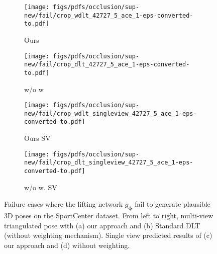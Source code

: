 \documentclass[runningheads]{llncs}
\def\Mat#1{{\boldsymbol{#1}}}
\begin{document}
\begin{figure*}
	\begin{subfigure}[b]{0.24\linewidth}        \centering
		\texttt{[image: figs/pdfs/occlusion/sup-new/fail/crop\_wdlt\_42727\_5\_ace\_1-eps-converted-to.pdf]}
		\caption{Ours}
\end{subfigure}
	\begin{subfigure}[b]{0.24\linewidth}        \centering
		\texttt{[image: figs/pdfs/occlusion/sup-new/fail/crop\_dlt\_42727\_5\_ace\_1-eps-converted-to.pdf]}
		\caption{w/o w}
\end{subfigure}
	\begin{subfigure}[b]{0.24\linewidth}        \centering
		\texttt{[image: figs/pdfs/occlusion/sup-new/fail/crop\_wdlt\_singleview\_42727\_5\_ace\_1-eps-converted-to.pdf]}
		\caption{Ours SV}
\end{subfigure}
	\begin{subfigure}[b]{0.24\linewidth}        \centering
		\texttt{[image: figs/pdfs/occlusion/sup-new/fail/crop\_dlt\_singleview\_42727\_5\_ace\_1-eps-converted-to.pdf]}
		\caption{\small w/o w. SV}
\end{subfigure}

	\vspace{-0.3cm}
	\caption{\small Failure cases where the lifting network $g_{\Mat{\phi}}$ fail to generate plausible 3D poses on the SportCenter dataset. From left to right, multi-view triangulated pose with (a) our approach and (b) Standard DLT (without weighting mechanism). Single view predicted results of (c) our approach and (d) without weighting.
	}
	\label{fig:occlusion_images_fail_1}
\end{figure*} 
\end{document}
